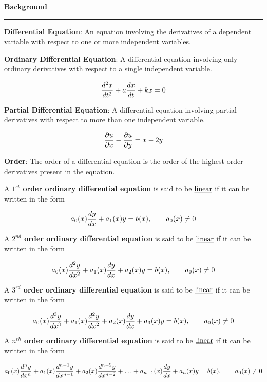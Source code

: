 \nopagenumbers
{\bf Background}
\vskip 1mm
\hrule

\vskip 6pt
{\bf Differential Equation}: An equation involving the derivatives of a dependent variable with respect to one or more independent variables.


\vskip 6pt
{\bf Ordinary Differential Equation}: A differential equation involving only ordinary derivatives with respect to a single independent variable.

$${d^2x\over dt^2}+a{dx\over dt}+kx=0$$

\vskip 6pt
{\bf Partial Differential Equation}: A differential equation involving partial derivatives with respect to more than one independent variable.

$${\partial u\over \partial x}-{\partial u\over \partial y}=x-2y$$

\vskip 6pt
{\bf Order}: The order of a differential equation is the order of the highest-order derivatives present in the equation.

\vskip 6pt
A {\bf $1^{st}$ order ordinary differential equation} is said to be $\underline{\hbox{linear}}$ if it can be written in the form

$$a_0(x){dy\over dx}+a_1(x)y=b(x), \quad\quad a_0(x)\neq 0$$

\vskip 6pt
A {\bf $2^{nd}$ order ordinary differential equation} is said to be $\underline{\hbox{linear}}$ if it can be written in the form

$$a_0(x){d^2y\over dx^2}+a_1(x){dy\over dx}+a_2(x)y=b(x), \quad\quad a_0(x)\neq 0$$

\vskip 6pt
A {\bf $3^{rd}$ order ordinary differential equation} is said to be $\underline{\hbox{linear}}$ if it can be written in the form

$$a_0(x){d^3y\over dx^3}+a_1(x){d^2y\over dx^2}+a_2(x){dy\over dx}+a_3(x)y=b(x), \quad\quad a_0(x)\neq 0$$

\vskip 6pt
A {\bf $n^{th}$ order ordinary differential equation} is said to be $\underline{\hbox{linear}}$ if it can be written in the form

$$a_0(x){d^ny\over dx^n}+a_1(x){d^{n-1}y\over dx^{n-1}}+a_2(x){d^{n-2}y\over dx^{n-2}}+\ldots+ a_{n-1}(x){dy\over dx}+a_n(x)y=b(x), \quad\quad a_0(x)\neq 0$$

\vfill\eject
\bye
